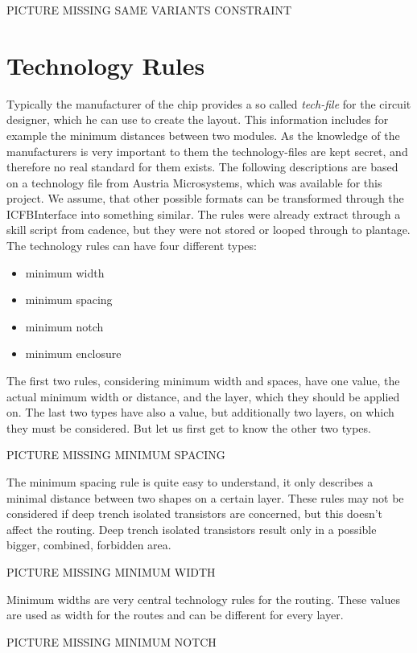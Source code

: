 PICTURE MISSING SAME VARIANTS CONSTRAINT

\section{Technology Rules}
Typically the manufacturer of the chip provides a so called \textit{tech-file} for the circuit designer, which he can use to create the layout. This information includes for example the minimum distances between two modules. As the knowledge of the manufacturers is very important to them the technology-files are kept secret, and therefore no real standard for them exists. The following descriptions are based on a technology file from Austria Microsystems, which was available for this project. We assume, that other possible formats can be transformed through the ICFBInterface into something similar. The rules were already extract through a skill script from cadence, but they were not stored or looped through to plantage. The technology rules can have four different types:

\begin{itemize}
\item minimum width
\item minimum spacing
\item minimum notch
\item minimum enclosure
\end{itemize}

The first two rules, considering minimum width and spaces, have one value, the actual minimum width or distance, and the layer, which they should be applied on. The last two types have also a value, but additionally two layers, on which they must be considered. But let us first get to know the other two types.

PICTURE MISSING MINIMUM SPACING

The minimum spacing rule is quite easy to understand, it only describes a minimal distance between two shapes on a certain layer. These rules may not be considered if deep trench isolated transistors are concerned, but this doesn't affect the routing. Deep trench isolated transistors result only in a possible bigger, combined, forbidden area.

PICTURE MISSING MINIMUM WIDTH

Minimum widths are very central technology rules for the routing. These values are used as width for the routes and can be different for every layer.

PICTURE MISSING MINIMUM NOTCH

